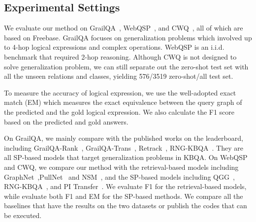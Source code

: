 \subsection{Experimental Settings}
We evaluate our method on GrailQA~\cite{gu2021beyond}, WebQSP~\cite{yih2016value}, and CWQ~\cite{talmor-berant-2018-web}, all of which are based on Freebase. GrailQA focuses on generalization problems which involved up to 4-hop logical expressions and complex operations. WebQSP is an i.i.d. benchmark that required 2-hop reasoning. Although CWQ is not designed to solve generalization problem, we can still separate out the zero-shot test set with all the unseen relations and classes, yielding 576/3519 zero-shot/all test set. 

To measure the accuracy of logical expression, we use the well-adopted exact match (EM) which measures the exact equivalence between the query graph of the predicted and the gold logical expression. We also calculate the F1 score based on the predicted and gold answers. 

On GrailQA, we mainly compare with the published works on the leaderboard, including GrailQA-Rank~\cite{gu2021beyond}, GrailQA-Trans~\cite{gu2021beyond},  Retrack~\cite{chen-etal-2021-retrack}, RNG-KBQA~\cite{ye2022rng}. They are all SP-based models that target generalization problems in KBQA.
On WebQSP and CWQ, we compare our method with the retrieval-based models including GraphNet~\cite{pu2018graphnet},PullNet~\cite{sun2019pullnet} and NSM~\cite{He-WSDM-2021}, and the SP-based models including QGG~\cite{lan2020query}, RNG-KBQA~\cite{ye2022rng}, and PI Transfer~\cite{cao-etal-2022-program}.
We evaluate F1 for the retrieval-based models, while evaluate both F1 and EM for the SP-based methods. We compare all the baselines that have the results on the two datasets or publish the codes that can be executed.


